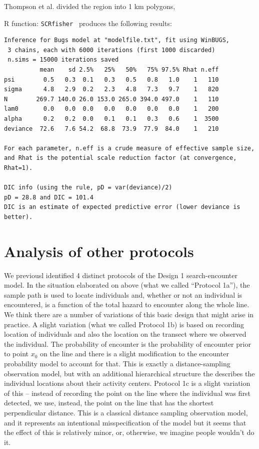 Thompson et al. divided the region into 1 km polygons,

R function: \mbox{\tt SCRfisher  } produces the following results:

{\small
\begin{verbatim}
Inference for Bugs model at "modelfile.txt", fit using WinBUGS,
 3 chains, each with 6000 iterations (first 1000 discarded)
 n.sims = 15000 iterations saved
          mean    sd 2.5%   25%   50%   75% 97.5% Rhat n.eff
psi        0.5   0.3  0.1   0.3   0.5   0.8   1.0    1   110
sigma      4.8   2.9  0.2   2.3   4.8   7.3   9.7    1   820
N        269.7 140.0 26.0 153.0 265.0 394.0 497.0    1   110
lam0       0.0   0.0  0.0   0.0   0.0   0.0   0.0    1   200
alpha      0.2   0.2  0.0   0.1   0.1   0.3   0.6    1  3500
deviance  72.6   7.6 54.2  68.8  73.9  77.9  84.0    1   210

For each parameter, n.eff is a crude measure of effective sample size,
and Rhat is the potential scale reduction factor (at convergence, Rhat=1).

DIC info (using the rule, pD = var(deviance)/2)
pD = 28.8 and DIC = 101.4
DIC is an estimate of expected predictive error (lower deviance is better).
\end{verbatim}
}


\section{Analysis of other protocols}

We previousl identified 4 distinct protocols of the Design 1
search-encounter model.
In the situation elaborated on above (what we called ``Protocol 1a''), the sample path is used to
locate individuals and, whether or not an individual is encountered,
is a function of the total hazard to encounter along the whole line.
We think there are a number of variations of this basic design that
might arise in practice.
A slight variation (what we called Protocol 1b) is based on 
recording location of individuals and also the location on the transect
where we observed the individual.  The probability of encounter is the
probability of encounter prior to point $x_{0}$ on the line
\citep{skaug_schweder:1999} and there is a slight modification to the
encounter probability model to account for that. This is exactly a
distance-sampling observation model, but with an additional
hierarchical structure the describes the individual locations about
their activity centers.  Protocol 1c is a slight variation of this --
instead of recording the point on the line where the individual was
first detected, we use, instead, the point on the line that has the
shortest perpendicular distance. This is a classical distance sampling
observation model, and it represents an intentional misspecification
of the model but it seems that the effect of this is relatively minor,
or, otherwise, we imagine people wouldn't do it.

